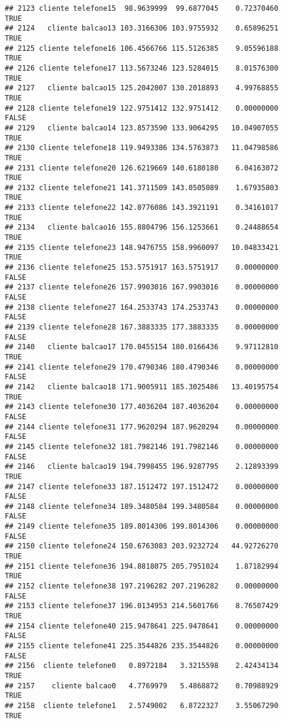 \documentclass[
]{article}
\begin{document}
\begin{verbatim}
## 2123 cliente telefone15  98.9639999  99.6877045    0.72370460     TRUE
## 2124   cliente balcao13 103.3166306 103.9755932    0.65896251     TRUE
## 2125 cliente telefone16 106.4566766 115.5126385    9.05596188     TRUE
## 2126 cliente telefone17 113.5673246 123.5284015    8.01576300     TRUE
## 2127   cliente balcao15 125.2042007 130.2018893    4.99768855     TRUE
## 2128 cliente telefone19 122.9751412 132.9751412    0.00000000    FALSE
## 2129   cliente balcao14 123.8573590 133.9064295   10.04907055     TRUE
## 2130 cliente telefone18 119.9493386 134.5763873   11.04798586     TRUE
## 2131 cliente telefone20 126.6219669 140.6180180    6.04163072     TRUE
## 2132 cliente telefone21 141.3711509 143.0505089    1.67935803     TRUE
## 2133 cliente telefone22 142.0776086 143.3921191    0.34161017     TRUE
## 2134   cliente balcao16 155.8804796 156.1253661    0.24488654     TRUE
## 2135 cliente telefone23 148.9476755 158.9960097   10.04833421     TRUE
## 2136 cliente telefone25 153.5751917 163.5751917    0.00000000    FALSE
## 2137 cliente telefone26 157.9903016 167.9903016    0.00000000    FALSE
## 2138 cliente telefone27 164.2533743 174.2533743    0.00000000    FALSE
## 2139 cliente telefone28 167.3883335 177.3883335    0.00000000    FALSE
## 2140   cliente balcao17 170.0455154 180.0166436    9.97112810     TRUE
## 2141 cliente telefone29 170.4790346 180.4790346    0.00000000    FALSE
## 2142   cliente balcao18 171.9005911 185.3025486   13.40195754     TRUE
## 2143 cliente telefone30 177.4036204 187.4036204    0.00000000    FALSE
## 2144 cliente telefone31 177.9620294 187.9620294    0.00000000    FALSE
## 2145 cliente telefone32 181.7982146 191.7982146    0.00000000    FALSE
## 2146   cliente balcao19 194.7998455 196.9287795    2.12893399     TRUE
## 2147 cliente telefone33 187.1512472 197.1512472    0.00000000    FALSE
## 2148 cliente telefone34 189.3480584 199.3480584    0.00000000    FALSE
## 2149 cliente telefone35 189.8014306 199.8014306    0.00000000    FALSE
## 2150 cliente telefone24 150.6763083 203.9232724   44.92726270     TRUE
## 2151 cliente telefone36 194.8818075 205.7951024    1.87182994     TRUE
## 2152 cliente telefone38 197.2196282 207.2196282    0.00000000    FALSE
## 2153 cliente telefone37 196.0134953 214.5601766    8.76507429     TRUE
## 2154 cliente telefone40 215.9478641 225.9478641    0.00000000    FALSE
## 2155 cliente telefone41 225.3544826 235.3544826    0.00000000    FALSE
## 2156  cliente telefone0   0.8972184   3.3215598    2.42434134     TRUE
## 2157    cliente balcao0   4.7769979   5.4868872    0.70988929     TRUE
## 2158  cliente telefone1   2.5749002   6.8722327    3.55067290     TRUE

\end{verbatim}
\end{document}
